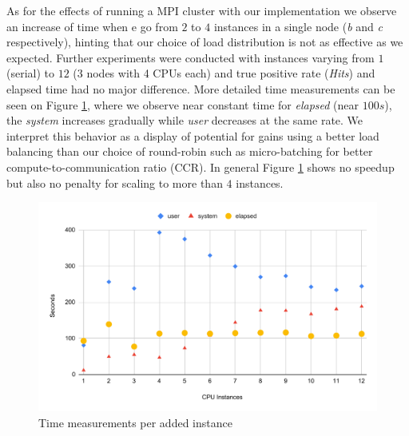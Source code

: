 As for the effects of running a MPI cluster with our implementation we observe
an increase of time when e go from $2$ to $4$ instances in a single node
(\emph{b} and \emph{c} respectively), hinting that our choice of load
distribution is not as effective as we expected.
Further experiments were conducted with instances varying from $1$ (serial) to
$12$ (3 nodes with 4 CPUs each) and true positive rate (\emph{Hits}) and elapsed
time had no major difference.
More detailed time measurements can be seen on Figure \ref{fig:speedup},
where we observe near constant time for \emph{elapsed} (near $100s$),
the \emph{system} increases gradually while \emph{user} decreases at the same rate.
We interpret this behavior as a display of potential for gains using a better
load balancing than our choice of round-robin such as micro-batching for better
compute-to-communication ratio (CCR).
In general Figure \ref{fig:speedup} shows no speedup but also no penalty for
scaling to more than $4$ instances.







\begin{figure}[hbt]
  \centering
  \includegraphics[width=\whencolumns{0.6}{1}\linewidth,page=1]{experiments/speedup-clean.pdf}
  \caption{Time measurements per added instance}
  \label{fig:speedup}
\end{figure}

